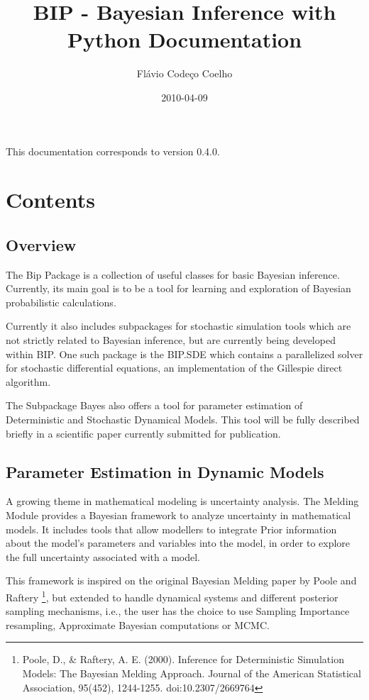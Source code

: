 \documentclass[a4paper,10pt,english]{manual}
\title{BIP - Bayesian Inference with Python Documentation}
\date{2010-04-09}
\author{Flávio Codeço Coelho}
\begin{document}
\maketitle
\tableofcontents
\hypertarget{--doc-index}{}


This documentation corresponds to version 0.4.0.


\chapter{Contents}

\resetcurrentobjects
\hypertarget{--doc-overview}{}

\section{Overview}

The Bip Package is a collection of useful classes for basic Bayesian inference. Currently, its main goal is to be a tool for learning and exploration of Bayesian probabilistic calculations.

Currently it also includes subpackages for stochastic simulation tools which are not strictly related to Bayesian inference, but are currently being developed within BIP. One such package is the BIP.SDE which contains a parallelized solver for stochastic differential equations, an implementation of the Gillespie direct algorithm.

The Subpackage Bayes also offers a tool for parameter estimation of Deterministic and Stochastic Dynamical Models. This tool will be fully described briefly in a scientific paper currently submitted for publication.

\resetcurrentobjects
\hypertarget{--doc-paramest}{}

\section{Parameter Estimation in Dynamic Models}

A growing theme in mathematical modeling is uncertainty analysis. The Melding Module provides a Bayesian framework to analyze uncertainty in mathematical models. It includes tools that allow modellers to integrate Prior information about the model's parameters and variables into the model, in order to explore the full uncertainty associated with a model.

This framework is inspired on the original Bayesian Melding paper by Poole and Raftery \footnote{
Poole, D., \& Raftery, A. E. (2000). Inference for Deterministic Simulation Models: The Bayesian Melding Approach. Journal of the American Statistical Association, 95(452), 1244-1255. doi:10.2307/2669764
}, but extended to handle dynamical systems and different posterior sampling mechanisms, i.e., the user has the choice to use Sampling Importance resampling, Approximate Bayesian computations or MCMC.
\end{document}
